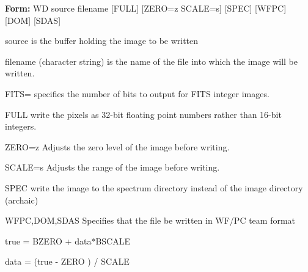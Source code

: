 {\newpage\clearpage
{}%
\begin{command}
  \item[\textbf{Form: } WD source filename {[FULL]} {[ZERO=z
       SCALE=s]} {[SPEC]} {[WFPC]} {[DOM]} {[SDAS]}\hfill]{}
\par\item[source]{is the buffer holding the image to be written}
\par\item[filename]{(character string) is the name of the file into which the
                 image will be written.}
\par\item[FITS=]{specifies the number of bits to output for FITS integer images.}
\par\item[FULL]{write the pixels as 32-bit floating point numbers rather than
       16-bit integers.}
\par\item[ZERO=z]{Adjusts the zero level of the image before writing.}
\par\item[SCALE=s]{Adjusts the range of the image before writing.}
\par\item[SPEC]{write the image to the spectrum directory instead of the
       image directory (archaic)}
\par\item[WFPC,DOM,SDAS]{Specifies that the file be written in WF/PC team format}
\end{command}%
\lthtmlfigureZ
\lthtmlcheckvsize\clearpage}

{\newpage\clearpage
{}%
\begin{hanging}
  \item{true = BZERO + data*BSCALE}
\end{hanging}%
\lthtmlfigureZ
\lthtmlcheckvsize\clearpage}

{\newpage\clearpage
{}%
\begin{hanging}
  \item{data = (true - ZERO ) / SCALE}
\end{hanging}%
\lthtmlfigureZ
\lthtmlcheckvsize\clearpage}

